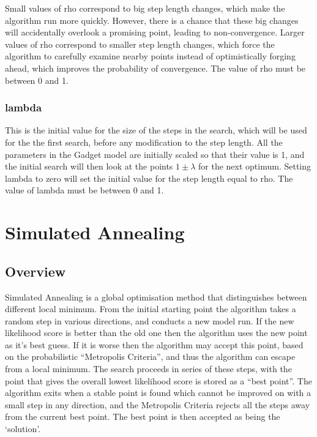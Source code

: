 \documentclass[]{book}
\begin{document}
Small values of rho correspond to big step length changes, which make
the algorithm run more quickly. However, there is a chance that these
big changes will accidentally overlook a promising point, leading to
non-convergence. Larger values of rho correspond to smaller step length
changes, which force the algorithm to carefully examine nearby points
instead of optimistically forging ahead, which improves the probability
of convergence. The value of rho must be between 0 and 1.

\hypertarget{lambda}{%
\subsubsection{lambda}\label{lambda}}

This is the initial value for the size of the steps in the search, which
will be used for the the first search, before any modification to the
step length. All the parameters in the Gadget model are initially scaled
so that their value is 1, and the initial search will then look at the
points \(1 \pm \lambda\) for the next optimum. Setting lambda to zero will
set the initial value for the step length equal to rho. The value of
lambda must be between 0 and 1.

\hypertarget{sec:simann}{%
\section{Simulated Annealing}\label{sec:simann}}

\hypertarget{subsec:simannover}{%
\subsection{Overview}\label{subsec:simannover}}

Simulated Annealing is a global optimisation method that distinguishes
between different local minimum. From the initial starting point the
algorithm takes a random step in various directions, and conducts a new
model run. If the new likelihood score is better than the old one then
the algorithm uses the new point as it's best guess. If it is worse then
the algorithm may accept this point, based on the probabilistic
``Metropolis Criteria'', and thus the algorithm can escape from a local
minimum. The search proceeds in series of these steps, with the point
that gives the overall lowest likelihood score is stored as a ``best
point''. The algorithm exits when a stable point is found which cannot be
improved on with a small step in any direction, and the Metropolis
Criteria rejects all the steps away from the current best point. The
best point is then accepted as being the `solution'.
\end{document}
